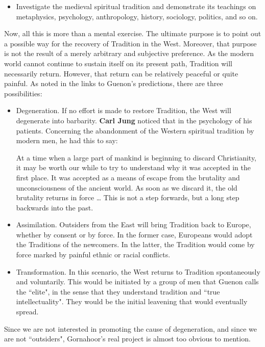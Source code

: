\begin{itemize}
\item Investigate the medieval spiritual tradition and demonstrate its teachings on metaphysics, psychology,
anthropology, history, sociology, politics, and so on. 
\end{itemize}
Now, all this is more than a mental exercise. The ultimate purpose is to point out a possible way for the recovery of
Tradition in the West. Moreover, that purpose is not the result of a merely arbitrary and subjective preference. As the
modern world cannot continue to sustain itself on its present path, Tradition will necessarily return. However, that
return can be relatively peaceful or quite painful. As noted in the links to Guenon's predictions,
there are three possibilities:

\begin{itemize}
\item Degeneration. If no effort is made to restore Tradition, the West will degenerate into barbarity. \textbf{Carl
Jung} noticed that in the psychology of his patients. Concerning the abandonment of the Western spiritual tradition by
modern men, he had this to say:

\begin{quotex}
At a time when a large part of mankind is beginning to discard Christianity, it may be worth our while to try to
understand why it was accepted in the first place. It was accepted as a means of escape from the brutality and
unconsciousness of the ancient world. As soon as we discard it, the old brutality returns in force … This is not a step
forwards, but a long step backwards into the past.
\end{quotex}
\item Assimilation. Outsiders from the East will bring Tradition back to Europe, whether by consent or by force. In the
former case, Europeans would adopt the Traditions of the newcomers. In the latter, the Tradition would come by force
marked by painful ethnic or racial conflicts. 
\item Transformation. In this scenario, the West returns to Tradition spontaneously and voluntarily. This would be
initiated by a group of men that Guenon calls the ``elite", in the sense that they understand tradition and ``true
intellectuality". They would be the initial leavening that would eventually spread. 
\end{itemize}
Since we are not interested in promoting the cause of degeneration, and since we are not ``outsiders",
Gornahoor's real project is almost too obvious to mention.

